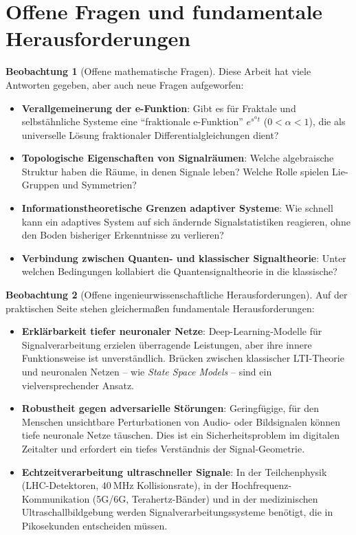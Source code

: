 ﻿\documentclass[a4paper,12pt]{report}
\theoremstyle{definition}
\newtheorem{beobachtung}{Beobachtung}
\begin{document}
	\section{Offene Fragen und fundamentale Herausforderungen}
	
	\begin{beobachtung}[Offene mathematische Fragen]
		Diese Arbeit hat viele Antworten gegeben, aber auch neue Fragen aufgeworfen:
		\begin{itemize}
			\item[-] \textbf{Verallgemeinerung der e-Funktion}: Gibt es für Fraktale und selbstähnliche Systeme eine ``fraktionale e-Funktion'' $e^{s^\alpha t}$ ($0 < \alpha < 1$), die als universelle Lösung fraktionaler Differentialgleichungen dient?
			\item[-] \textbf{Topologische Eigenschaften von Signalräumen}: Welche algebraische Struktur haben die Räume, in denen Signale leben? Welche Rolle spielen Lie-Gruppen und Symmetrien?
			\item[-] \textbf{Informationstheoretische Grenzen adaptiver Systeme}: Wie schnell kann ein adaptives System auf sich ändernde Signalstatistiken reagieren, ohne den Boden bisheriger Erkenntnisse zu verlieren?
			\item[-] \textbf{Verbindung zwischen Quanten- und klassischer Signaltheorie}: Unter welchen Bedingungen kollabiert die Quantensignaltheorie in die klassische?
		\end{itemize}
	\end{beobachtung}
	
	\begin{beobachtung}[Offene ingenieurwissenschaftliche Herausforderungen]
		Auf der praktischen Seite stehen gleichermaßen fundamentale Herausforderungen:
		\begin{itemize}
			\item[-] \textbf{Erklärbarkeit tiefer neuronaler Netze}: Deep-Learning-Modelle für Signalverarbeitung erzielen überragende Leistungen, aber ihre innere Funktionsweise ist unverständlich. Brücken zwischen klassischer LTI-Theorie und neuronalen Netzen -- wie \emph{State Space Models} -- sind ein vielversprechender Ansatz.
			\item[-] \textbf{Robustheit gegen adversarielle Störungen}: Geringfügige, für den Menschen unsichtbare Perturbationen von Audio- oder Bildsignalen können tiefe neuronale Netze täuschen. Dies ist ein Sicherheitsproblem im digitalen Zeitalter und erfordert ein tiefes Verständnis der Signal-Geometrie.
			\item[-] \textbf{Echtzeitverarbeitung ultraschneller Signale}: In der Teilchenphysik (LHC-Detektoren, $40~\text{MHz}$ Kollisionsrate), in der Hochfrequenz-Kommunikation (5G/6G, Terahertz-Bänder) und in der medizinischen Ultraschallbildgebung werden Signalverarbeitungssysteme benötigt, die in Pikosekunden entscheiden müssen.
		\end{itemize}
	\end{beobachtung}
	
\end{document}
